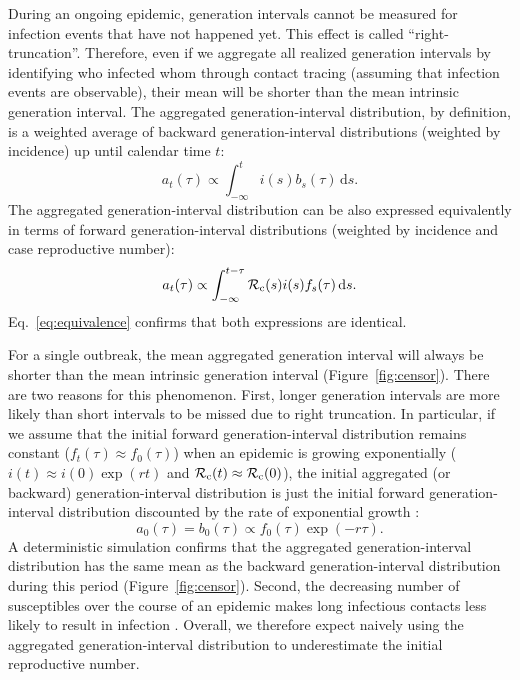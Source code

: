 \documentclass[12pt]{article}
\newcommand{\eref}[1]{Eq.~\ref{eq:#1}}
\begin{document}
During an ongoing epidemic, generation intervals cannot be measured for infection events that have not happened yet.
This effect is called ``right-truncation''.
Therefore, even if we aggregate all realized generation intervals by identifying who infected whom through contact tracing (assuming that infection events are observable), their mean will be shorter than the mean intrinsic generation interval.
The aggregated generation-interval distribution, by definition, is a weighted average of backward generation-interval distributions (weighted by incidence) up until calendar time $t$:
\begin{equation}
a_t(\tau) \propto \int_{-\infty}^t i(s) b_s(\tau) \,\mathrm{d}s.
\end{equation}
The aggregated generation-interval distribution can be also expressed equivalently in terms of forward generation-interval distributions (weighted by incidence and case reproductive number):
\begin{equation}
a_t(\tau) \propto \int_{-\infty}^{t-\tau} \mathcal R_{\rm c}(s) i(s) f_s(\tau) \,\mathrm{d}s.
\end{equation}
\eref{equivalence} confirms that both expressions are identical.

For a single outbreak, the mean aggregated generation interval will always be shorter than the mean intrinsic generation interval (Figure~\ref{fig:censor}).
There are two reasons for this phenomenon.
First, longer generation intervals are more likely than short intervals to be missed due to right truncation.
In particular, if we assume that the initial forward generation-interval distribution remains constant ($f_t(\tau) \approx f_0(\tau)$) when an epidemic is growing exponentially ($i(t) \approx i(0) \exp(rt)$ and $\mathcal R_{\rm c}(t) \approx \mathcal R_{\rm c}(0)$),
the initial aggregated (or backward) generation-interval distribution is just the initial forward generation-interval distribution discounted by the rate of exponential growth \citep{britton2019estimation}:
\begin{equation}
a_0(\tau) = b_0(\tau) \propto f_0(\tau) \exp(-r\tau).
\label{eq:exp}
\end{equation}
A deterministic simulation confirms that the aggregated generation-interval distribution has the same mean as the backward generation-interval distribution during this period (Figure~\ref{fig:censor}).
Second, the decreasing number of susceptibles over the course of an epidemic makes long infectious contacts less likely to result in infection \citep{champredon2015intrinsic}.
Overall, we therefore expect naively using the aggregated generation-interval distribution to underestimate the initial reproductive number.
\end{document}
